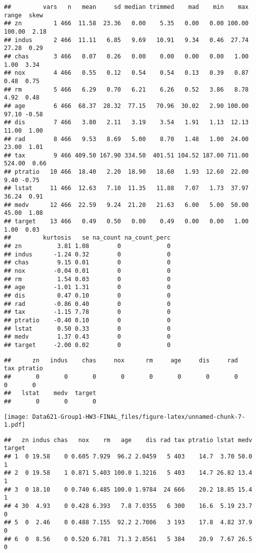 \documentclass[
]{article}
\begin{document}
\begin{verbatim}
##         vars   n   mean     sd median trimmed    mad    min    max  range  skew
## zn         1 466  11.58  23.36   0.00    5.35   0.00   0.00 100.00 100.00  2.18
## indus      2 466  11.11   6.85   9.69   10.91   9.34   0.46  27.74  27.28  0.29
## chas       3 466   0.07   0.26   0.00    0.00   0.00   0.00   1.00   1.00  3.34
## nox        4 466   0.55   0.12   0.54    0.54   0.13   0.39   0.87   0.48  0.75
## rm         5 466   6.29   0.70   6.21    6.26   0.52   3.86   8.78   4.92  0.48
## age        6 466  68.37  28.32  77.15   70.96  30.02   2.90 100.00  97.10 -0.58
## dis        7 466   3.80   2.11   3.19    3.54   1.91   1.13  12.13  11.00  1.00
## rad        8 466   9.53   8.69   5.00    8.70   1.48   1.00  24.00  23.00  1.01
## tax        9 466 409.50 167.90 334.50  401.51 104.52 187.00 711.00 524.00  0.66
## ptratio   10 466  18.40   2.20  18.90   18.60   1.93  12.60  22.00   9.40 -0.75
## lstat     11 466  12.63   7.10  11.35   11.88   7.07   1.73  37.97  36.24  0.91
## medv      12 466  22.59   9.24  21.20   21.63   6.00   5.00  50.00  45.00  1.08
## target    13 466   0.49   0.50   0.00    0.49   0.00   0.00   1.00   1.00  0.03
##         kurtosis   se na_count na_count_perc
## zn          3.81 1.08        0             0
## indus      -1.24 0.32        0             0
## chas        9.15 0.01        0             0
## nox        -0.04 0.01        0             0
## rm          1.54 0.03        0             0
## age        -1.01 1.31        0             0
## dis         0.47 0.10        0             0
## rad        -0.86 0.40        0             0
## tax        -1.15 7.78        0             0
## ptratio    -0.40 0.10        0             0
## lstat       0.50 0.33        0             0
## medv        1.37 0.43        0             0
## target     -2.00 0.02        0             0
\end{verbatim}

\begin{verbatim}
##      zn   indus    chas     nox      rm     age     dis     rad     tax ptratio 
##       0       0       0       0       0       0       0       0       0       0 
##   lstat    medv  target 
##       0       0       0
\end{verbatim}

\texttt{[image: Data621-Group1-HW3-FINAL\_files/figure-latex/unnamed-chunk-7-1.pdf]}

\begin{verbatim}
##   zn indus chas   nox    rm   age    dis rad tax ptratio lstat medv target
## 1  0 19.58    0 0.605 7.929  96.2 2.0459   5 403    14.7  3.70 50.0      1
## 2  0 19.58    1 0.871 5.403 100.0 1.3216   5 403    14.7 26.82 13.4      1
## 3  0 18.10    0 0.740 6.485 100.0 1.9784  24 666    20.2 18.85 15.4      1
## 4 30  4.93    0 0.428 6.393   7.8 7.0355   6 300    16.6  5.19 23.7      0
## 5  0  2.46    0 0.488 7.155  92.2 2.7006   3 193    17.8  4.82 37.9      0
## 6  0  8.56    0 0.520 6.781  71.3 2.8561   5 384    20.9  7.67 26.5      0
\end{verbatim}
\end{document}
